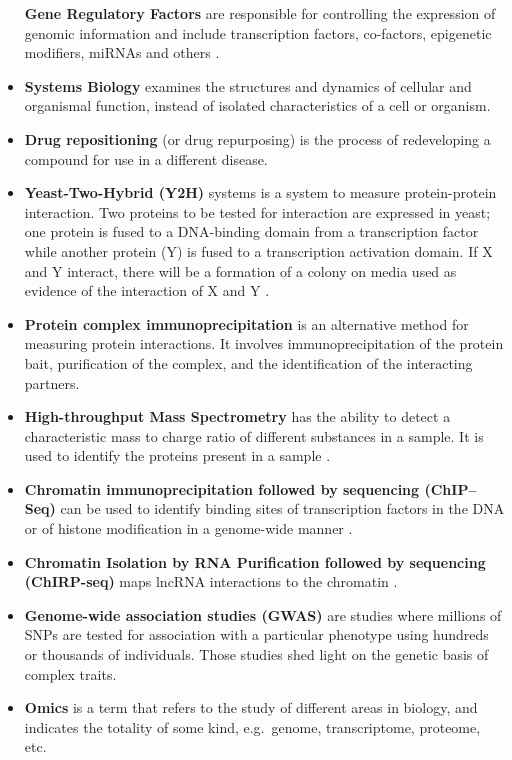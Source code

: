 \documentclass[
]{book}
\begin{document}
\begin{itemize}
  \textbf{Gene Regulatory Factors} are responsible for controlling the expression of genomic information and include transcription factors, co-factors, epigenetic modifiers, miRNAs and others \citep{Hobert2008GeneMicroRNAs}.
\item
  \textbf{Systems Biology} examines the structures and dynamics of cellular and organismal function, instead of isolated characteristics of a cell or organism.
\item
  \textbf{Drug repositioning} (or drug repurposing) is the process of redeveloping a compound for use in a different disease.
\item
  \textbf{Yeast-Two-Hybrid (Y2H)} systems is a system to measure protein-protein interaction. Two proteins to be tested for interaction are expressed in yeast; one protein is fused to a DNA-binding domain from a transcription factor while another protein (Y) is fused to a transcription activation domain. If X and Y interact, there will be a formation of a colony on media used as evidence of the interaction of X and Y \citep{Parrish2006YeastMapping}.
\item
  \textbf{Protein complex immunoprecipitation} is an alternative method for measuring protein interactions. It involves immunoprecipitation of the protein bait, purification of the complex, and the identification of the interacting partners.
\item
  \textbf{High-throughput Mass Spectrometry} has the ability to detect a characteristic mass to charge ratio of different substances in a sample. It is used to identify the proteins present in a sample \citep{Kempa2019HighAnalysis}.
\item
  \textbf{Chromatin immunoprecipitation followed by sequencing (ChIP--Seq)} can be used to identify binding sites of transcription factors in the DNA or of histone modification in a genome-wide manner \citep{Park2009ChIP-seq:Technology}.
\item
  \textbf{Chromatin Isolation by RNA Purification followed by sequencing (ChIRP-seq)} maps lncRNA interactions to the chromatin \citep{Park2009ChIP-seq:Technology}.
\item
  \textbf{Genome-wide association studies (GWAS)} are studies where millions of SNPs are tested for association with a particular phenotype using hundreds or thousands of individuals. Those studies shed light on the genetic basis of complex traits.
\item
  \textbf{Omics} is a term that refers to the study of different areas in biology, and indicates the totality of some kind, e.g.~genome, transcriptome, proteome, etc.
\end{itemize}
\end{document}
